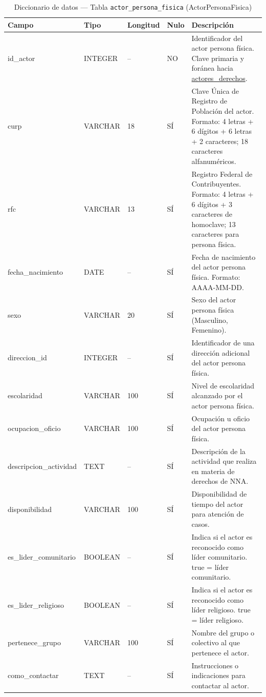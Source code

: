 \begin{table}[H]
	\centering
	\caption{Diccionario de datos --- Tabla \texttt{actor\_persona\_fisica} (ActorPersonaFisica)}
	\label{tab:data-dict-actor_persona_fisica}
	\scriptsize
	\begin{tabular}{>{\ttfamily\raggedright\arraybackslash}p{3.6cm} p{1.6cm} p{1.3cm} p{0.7cm} p{5.6cm}}
		\toprule
		\textbf{Campo} & \textbf{Tipo} & \textbf{Longitud} & \textbf{Nulo} & \textbf{Descripción} \\
		\midrule
		id\_actor & INTEGER & -- & NO & Identificador del actor persona física. Clave primaria y foránea hacia \hyperlink{ActoresDerechos}{actores\_derechos}. \\
		curp & VARCHAR & 18 & SÍ & Clave Única de Registro de Población del actor. Formato: 4 letras + 6 dígitos + 6 letras + 2 caracteres; 18 caracteres alfanuméricos. \\
		rfc & VARCHAR & 13 & SÍ & Registro Federal de Contribuyentes. Formato: 4 letras + 6 dígitos + 3 caracteres de homoclave; 13 caracteres para persona física. \\
		fecha\_nacimiento & DATE & -- & SÍ & Fecha de nacimiento del actor persona física. Formato: AAAA-MM-DD. \\
		sexo & VARCHAR & 20 & SÍ & Sexo del actor persona física (Masculino, Femenino). \\
		direccion\_id & INTEGER & -- & SÍ & Identificador de una dirección adicional del actor persona física. \\
		escolaridad & VARCHAR & 100 & SÍ & Nivel de escolaridad alcanzado por el actor persona física. \\
		ocupacion\_oficio & VARCHAR & 100 & SÍ & Ocupación u oficio del actor persona física. \\
		descripcion\_actividad & TEXT & -- & SÍ & Descripción de la actividad que realiza en materia de derechos de NNA. \\
		disponibilidad & VARCHAR & 100 & SÍ & Disponibilidad de tiempo del actor para atención de casos. \\
		es\_lider\_comunitario & BOOLEAN & -- & SÍ & Indica si el actor es reconocido como líder comunitario. true = líder comunitario. \\
		es\_lider\_religioso & BOOLEAN & -- & SÍ & Indica si el actor es reconocido como líder religioso. true = líder religioso. \\
		pertenece\_grupo & VARCHAR & 100 & SÍ & Nombre del grupo o colectivo al que pertenece el actor. \\
		como\_contactar & TEXT & -- & SÍ & Instrucciones o indicaciones para contactar al actor. \\
		\bottomrule
	\end{tabular}
\end{table}

